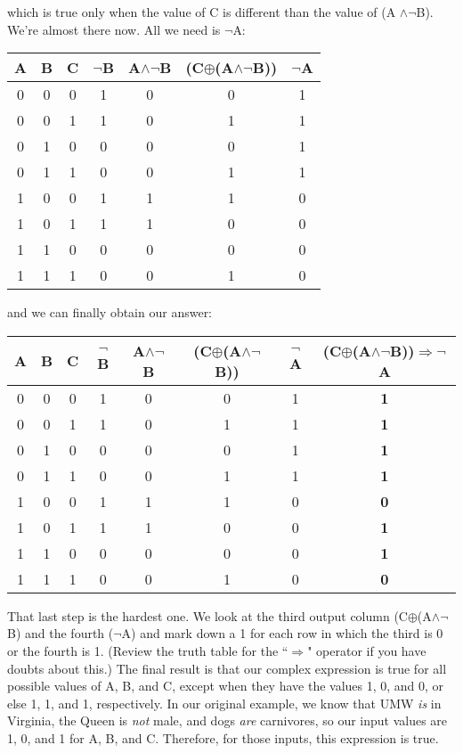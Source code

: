 which is true only when the value of C is different than the value of (A
$\wedge \neg$B). We're almost there now. All we need is $\neg$A:
\begin{nobreak}
\begin{center}
\begin{tabular}{c c c|c c c c}
A & B & C & $\neg$B & A$\wedge \neg$B & (C$\oplus$(A$\wedge \neg$B)) &
$\neg$A \\
\hline
0 & 0 & 0 & 1 & 0 & 0 & 1 \\
0 & 0 & 1 & 1 & 0 & 1 & 1 \\
0 & 1 & 0 & 0 & 0 & 0 & 1 \\
0 & 1 & 1 & 0 & 0 & 1 & 1 \\
1 & 0 & 0 & 1 & 1 & 1 & 0 \\
1 & 0 & 1 & 1 & 1 & 0 & 0 \\
1 & 1 & 0 & 0 & 0 & 0 & 0 \\
1 & 1 & 1 & 0 & 0 & 1 & 0 \\
\end{tabular}
\end{center}
\end{nobreak}
and we can finally obtain our answer:
\footnotesize
\begin{nobreak}
\begin{center}
\begin{tabular}{c c c|c c c c c}
A & B & C & $\neg$B & A$\wedge \neg$B & (C$\oplus$(A$\wedge \neg$B)) & $\neg$A & (C$\oplus$(A$\wedge \neg$B))$\Rightarrow$$\neg$A \\
\hline
0 & 0 & 0 & 1 & 0 & 0 & 1 & \textbf{1} \\
0 & 0 & 1 & 1 & 0 & 1 & 1 & \textbf{1} \\
0 & 1 & 0 & 0 & 0 & 0 & 1 & \textbf{1} \\
0 & 1 & 1 & 0 & 0 & 1 & 1 & \textbf{1} \\
1 & 0 & 0 & 1 & 1 & 1 & 0 & \textbf{0} \\
1 & 0 & 1 & 1 & 1 & 0 & 0 & \textbf{1} \\
1 & 1 & 0 & 0 & 0 & 0 & 0 & \textbf{1} \\
1 & 1 & 1 & 0 & 0 & 1 & 0 & \textbf{0} \\
\end{tabular}
\end{center}
\end{nobreak}
\normalsize
{}
That last step is the hardest one. We look at the third output column
(C$\oplus$(A$\wedge \neg$B) and the fourth ($\neg$A) and mark down a 1 for
each row in which the third is 0 or the fourth is 1. (Review the truth
table for the ``$\Rightarrow$" operator if you have doubts about this.) The
final result is that our complex expression is true for all possible values
of A, B, and C, except when they have the values 1, 0, and 0, or else 1, 1,
and 1, respectively. In our original example, we know that UMW \textit{is}
in Virginia, the Queen is \textit{not} male, and dogs \textit{are}
carnivores, so our input values are 1, 0, and 1 for A, B, and C. Therefore,
for those inputs, this expression is true.


